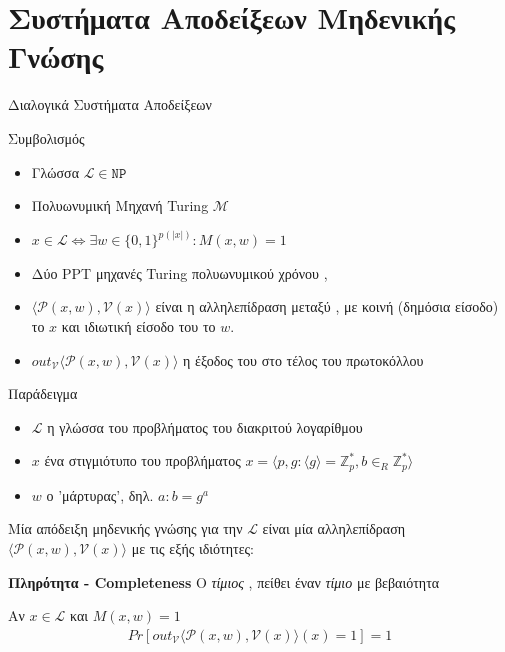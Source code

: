 \documentclass[handout]{beamer}
\begin{document}
\section{Συστήματα Αποδείξεων Μηδενικής Γνώσης}
\begin{frame}[allowframebreaks]{Διαλογικά Συστήματα Αποδείξεων}
\begin{block}{Συμβολισμός}
\begin{itemize}
\item Γλώσσα $ \mathcal{L} \in \mathtt{NP}$
\item Πολυωνυμική Mηχανή Turing $\mathcal{M}$
\item $x \in \mathcal{L} \Leftrightarrow \exists w \in \{0,1\}^{p(|x|)}: M(x,w) = 1$
\item Δύο PPT μηχανές Turing πολυωνυμικού χρόνου \prv, \ver
\item $\langle \mathcal{P}(x,w), \mathcal{V}(x) \rangle$ είναι η αλληλεπίδραση μεταξύ  \prv, \ver με κοινή (δημόσια είσοδο) το $x$ και ιδιωτική είσοδο του \prv το $w$.
\item $out_\mathcal{V}{\langle \mathcal{P}(x,w), \mathcal{V}(x) \rangle}$ η έξοδος του \ver στο τέλος του πρωτοκόλλου
\end{itemize}
\end{block}

\framebreak

\begin{block}{Παράδειγμα}
\begin{itemize}
\item $\mathcal{L}$ η γλώσσα του προβλήματος του διακριτού λογαρίθμου
\item $x$ ένα στιγμιότυπο του προβλήματος $x=\langle p,g: \langle g \rangle = \mathbb{Z}_p^*, b  \in_R \mathbb{Z}_p^* \rangle$
\item $w$ ο 'μάρτυρας', δηλ. $a: b = g^a$
\end{itemize}
\end{block}

\framebreak

Μία απόδειξη μηδενικής γνώσης για την $ \mathcal{L} $ είναι μία αλληλεπίδραση $\langle\mathcal{P}(x,w), \mathcal{V}(x) \rangle$ με τις εξής ιδιότητες:

\begin{block}{\textbf{Πληρότητα - Completeness}}  
Ο \emph{τίμιος} \prv, πείθει έναν \emph{τίμιο} \ver με  βεβαιότητα 

Αν  $x \in \mathcal{L}$ και $M(x,w) = 1$
\begin{align*}
Pr[out_{\mathcal{V}} \langle \mathcal{P}(x,w), \mathcal{V}(x) \rangle (x)=1] = 1  
\end{align*}
\end{block} 


\end{frame}
\end{document}
